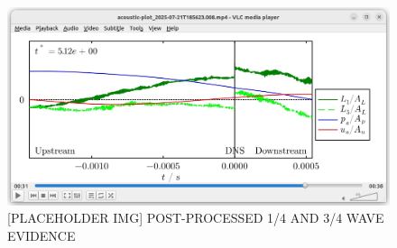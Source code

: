 \begin{figure}[t]
\centering
\includegraphics[scale=0.35]{assets/graphs/pp-tones.png}
\caption{[PLACEHOLDER IMG] POST-PROCESSED 1/4 AND 3/4 WAVE EVIDENCE}
\label{fig:pp-tones}
\end{figure}


